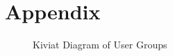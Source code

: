 \documentclass[
    USenglish,
    accentcolor=9c,
    fontsize= 12pt,
    a4paper,
    aspectratio=169,
    colorback=true,
    fancy_row_colors,
    leqno,
    fleqn,
    boxarc=3pt,
    fleqn,
    main,
    design=2008, %
]{algoslides}
\begin{document}
    \section{Appendix}
    \begin{frame}
        \slidehead{}
        \vspace{-2em}
        \begin{figure}
            \centering
            
            \caption{Kiviat Diagram of User Groups}
            \label{fig:user-groups-kiviat-diagram}
        \end{figure}
    \end{frame}
\end{document}

